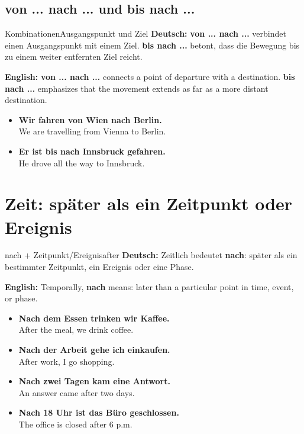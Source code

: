 \documentclass[a4paper,11pt]{article}
\newcommand{\GermanText}[1]{\textbf{Deutsch: }#1\par}
\newcommand{\EnglishText}[1]{{\small\color{SoftGray}\textbf{English: }#1\par}}
\newcommand{\ExampleItem}[2]{\item \textbf{#1}\\{\small\color{SoftGray}#2}}
\begin{document}
        \subsection{von ... nach ... und bis nach ...}

        \begin{grammarentry}{Kombinationen}{Ausgangspunkt und Ziel}
            \GermanText{\textbf{von ... nach ...} verbindet einen Ausgangspunkt mit einem Ziel. \textbf{bis nach ...} betont, dass die Bewegung bis zu einem weiter entfernten Ziel reicht.}
            \EnglishText{\textbf{von ... nach ...} connects a point of departure with a destination. \textbf{bis nach ...} emphasizes that the movement extends as far as a more distant destination.}
        \end{grammarentry}

        \begin{exbox}
            \begin{itemize}
                \ExampleItem{Wir fahren von Wien nach Berlin.}{We are travelling from Vienna to Berlin.}
                \ExampleItem{Er ist bis nach Innsbruck gefahren.}{He drove all the way to Innsbruck.}
            \end{itemize}
        \end{exbox}


    \section{Zeit: später als ein Zeitpunkt oder Ereignis}

        \begin{grammarentry}{nach + Zeitpunkt/Ereignis}{after}
            \GermanText{Zeitlich bedeutet \textbf{nach}: später als ein bestimmter Zeitpunkt, ein Ereignis oder eine Phase.}
            \EnglishText{Temporally, \textbf{nach} means: later than a particular point in time, event, or phase.}
        \end{grammarentry}

        \begin{exbox}
            \begin{itemize}
                \ExampleItem{Nach dem Essen trinken wir Kaffee.}{After the meal, we drink coffee.}
                \ExampleItem{Nach der Arbeit gehe ich einkaufen.}{After work, I go shopping.}
                \ExampleItem{Nach zwei Tagen kam eine Antwort.}{An answer came after two days.}
                \ExampleItem{Nach 18 Uhr ist das Büro geschlossen.}{The office is closed after 6 p.m.}
            \end{itemize}
        \end{exbox}
\end{document}
